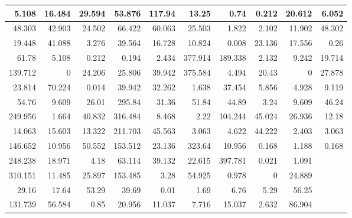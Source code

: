 \documentclass[12pt,a4paper,oneside]{article}
\begin{document}
\begin{tabular}{ | r | r | r | r | r | r | r | r | r | r | }
\hline
	5.108 & 16.484 & 29.594 & 53.876 & 117.94 & 13.25 & 0.74 & 0.212 & 20.612 & 6.052 \\ \hline
	48.303 & 42.903 & 24.502 & 66.422 & 60.063 & 25.503 & 1.822 & 2.102 & 11.902 & 48.302 \\ \hline
	19.448 & 41.088 & 3.276 & 39.564 & 16.728 & 10.824 & 0.008 & 23.136 & 17.556 & 0.26 \\ \hline
	61.78 & 5.108 & 0.212 & 0.194 & 2.434 & 377.914 & 189.338 & 2.132 & 9.242& 19.714 \\ \hline
	139.712 & 0 & 24.206 & 25.806 & 39.942 & 375.584 & 4.494 & 20.43 & 0 & 27.878 \\ \hline
	23.814 & 70.224 & 0.014 & 39.942 & 32.262 & 1.638 & 37.454 & 5.856 & 4.928 & 9.119\\ \hline
	54.76 & 9.609& 26.01 & 295.84 & 31.36 & 51.84 & 44.89 & 3.24 & 9.609& 46.24 \\ \hline
	249.956 & 1.664 & 40.832 & 316.484 & 8.468 & 2.22 & 104.244 & 45.024 & 26.936 & 12.18 \\ \hline
	14.063 & 15.603 & 13.322 & 211.703 & 45.563 & 3.063 & 4.622 & 44.222 & 2.403 & 3.063 \\ \hline
	146.652 & 10.956 & 50.552 & 153.512 & 23.136 & 323.64 & 10.956 & 0.168 & 1.188 & 0.168 \\ \hline
	248.238 & 18.971 & 4.18 & 63.114 & 39.132 & 22.615 & 397.781 & 0.021 & 1.091 &  \\ \hline
	310.151 & 11.485 & 25.897 & 153.485 & 3.28 & 54.925 & 0.978 & 0 & 24.889 &  \\ \hline
	29.16 & 17.64 & 53.29 & 39.69 & 0.01 & 1.69 & 6.76 & 5.29 & 56.25 &  \\ \hline
	131.739 & 56.584 & 0.85 & 20.956 & 11.037 & 7.716 & 15.037 & 2.632 & 86.904 &  \\ \hline
\end{tabular}

\end{document}
